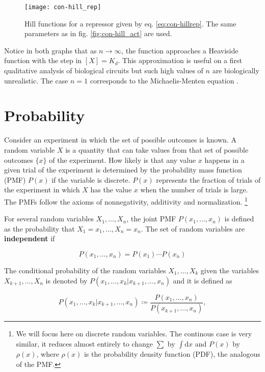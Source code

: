 \begin{figure}[H]
  \centering
  \texttt{[image: con-hill\_rep]}
  \caption[Hill functions for a repressor]{\label{fig:con-hill_rep} Hill functions for a repressor given by eq. \eqref{eq:con-hillrep}. The same parameters as in fig. \ref{fig:con-hill_act} are used.}
\end{figure}

Notice in both graphs that as $n\rightarrow\infty$, the function approaches a Heaviside function with the step in $[X] = K_d$. This approximation is useful on a first qualitative analysis of biological circuits but such high values of $n$ are biologically unrealistic. The case $n=1$ corresponds to the Michaelis-Menten equation \cite{alon06}.

\section{Probability}

Consider an experiment in which the set of possible outcomes is known. A random variable $X$ is a quantity that can take values from that set of possible outcomes $\{x\}$ of the experiment. How likely is that any value $x$ happens in a given trial of the experiment is determined by the probability mass function (PMF) $P(x)$ if the variable is discrete. $P(x)$ represents the fraction of trials of the experiment in which $X$ has the value $x$ when the number of trials is large. The PMFs follow the axioms of nonnegativity, additivity and normalization. \cite{bertsekas08} \footnote{We will focus here on discrete random variables. The continous case is very similar, it reduces almost entirely to change $\sum$ by $\int\mathrm{d}x$ and $P(x)$ by $\rho(x)$, where $\rho(x)$ is the probability density function (PDF), the analogous of the PMF.} 

For several random variables $X_1,\dotsc,X_n$, the joint PMF  $P(x_1,\dotsc,x_n)$ is defined as the probability that $X_1=x_1,\dotsc,X_n=x_n$. The set of random variables are \textbf{independent} if

\begin{equation*}
  P(x_1,\dotsc,x_n) = P(x_1)\dotsm P(x_n)
\end{equation*}

The conditional probability of the random variables $X_1,\dotsc,X_k$ given the variables $X_{k+1},\dotsc,X_n$ is denoted by $P(x_1,\dotsc,x_k|x_{k+1},\dotsc,x_n)$ and it is defined as

\begin{equation*}
  P(x_1,\dotsc,x_k|x_{k+1},\dotsc,x_n) \coloneqq \frac{P(x_1,\dotsc,x_n)}{P(x_{k+1},\dotsc,x_n)},
\end{equation*}

